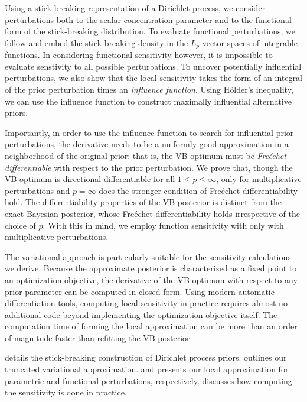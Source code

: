 Using a stick-breaking representation of a Dirichlet process, we consider
perturbations both to the scalar concentration parameter and to the functional
form of the stick-breaking distribution. To evaluate functional perturbations,
we follow \cite{gustafson:1996:local} and embed the stick-breaking density in
the $L_p$ vector spaces of integrable functions. In considering functional
sensitivity however, it is impossible to evaluate senstivity to all possible
perturbations. To uncover potentially influential perturbations, we also show
that the local sensitivity takes the form of an integral of the prior
perturbation times an \textit{influence function}. Using H{\"o}lder's
inequality, we can use the influence function to construct maximally influential
alternative priors.

Importantly, in order to use the influence function to search for
influential prior perturbations, the derivative needs to be a
uniformly good approximation in
a neighborhood of the original prior: that is, the VB optimum must be
\textit{Fre{\'e}chet differentiable} with respect to the prior perturbation.
We prove that, though the VB optimum is directional differentiable for all
$1 \le p \le \infty$,  only for multiplicative perturbations and
$p=\infty$ does the stronger condition of Fre{\'e}chet differentiability hold.
The differentiability properties of the VB posterior is distinct from the
exact Bayesian posterior, whose Fre{\'e}chet differentiability
holds irrespective of the choice of $p$.
With this in mind, we employ function sensitivity with only with multiplicative
perturbations.

The variational approach is particularly suitable for the
sensitivity calculations we derive.
Because the approximate posterior is characterized as a fixed point to an optimization
objective, the derivative of the VB optimum with respect to any prior
parameter can be computed in closed form.
Using modern automatic differentiation tools, computing local sensitivity
in practice requires almost no additional code beyond
implementing the optimization objective itself.
The computation time of forming the local approximation can be
more than an order of magnitude faster than refitting the VB posterior.

 details the stick-breaking construction of Dirichlet process priors.
 outlines our truncated variational approximation.
 and  presents our
local approximation for parametric
and functional perturbations, respectively.
 discusses how computing the sensitivity is done in practice.

